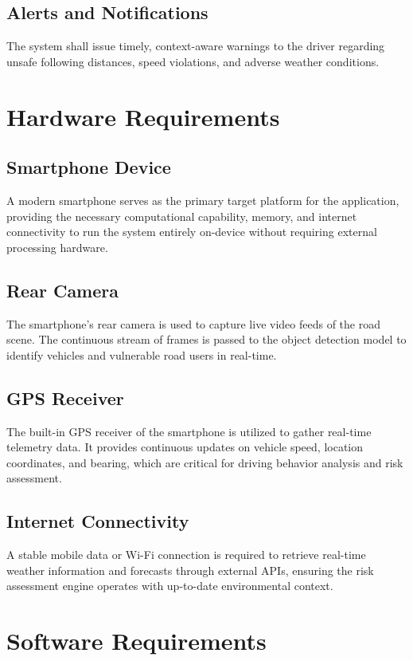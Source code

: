 \subsection{Alerts and Notifications}
The system shall issue timely, context-aware warnings to the driver regarding unsafe following distances, speed violations, and adverse weather conditions.
\section{Hardware Requirements}

\subsection{Smartphone Device}
A modern smartphone serves as the primary target platform for the application, providing the necessary computational capability, memory, and internet connectivity to run the system entirely on-device without requiring external processing hardware.

\subsection{Rear Camera}
The smartphone's rear camera is used to capture live video feeds of the road scene. The continuous stream of frames is passed to the object detection model to identify vehicles and vulnerable road users in real-time.

\subsection{GPS Receiver}
The built-in GPS receiver of the smartphone is utilized to gather real-time telemetry data. It provides continuous updates on vehicle speed, location coordinates, and bearing, which are critical for driving behavior analysis and risk assessment.

\subsection{Internet Connectivity}
A stable mobile data or Wi-Fi connection is required to retrieve real-time weather information and forecasts through external APIs, ensuring the risk assessment engine operates with up-to-date environmental context.

\section{Software Requirements}

